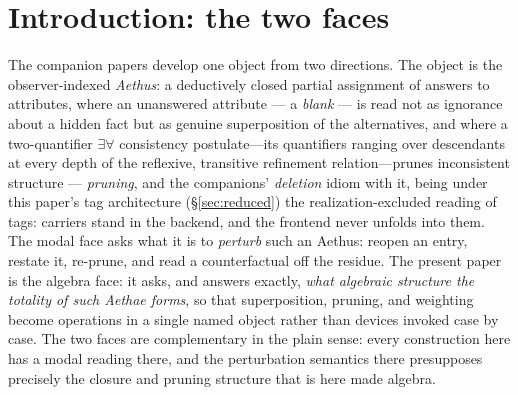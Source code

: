 \begin{abstract}
\end{abstract}

\section{Introduction: the two faces}
\label{sec:intro}

The companion papers develop one object from two directions. The object is the observer-indexed \emph{Aethus}: a deductively closed partial assignment of answers to attributes, where an unanswered attribute --- a \emph{blank} --- is read not as ignorance about a hidden fact but as genuine superposition of the alternatives, and where a two-quantifier $\exists\forall$ consistency postulate---its quantifiers ranging over descendants at every depth of the reflexive, transitive refinement relation---prunes inconsistent structure --- \emph{pruning}, and the companions' \emph{deletion} idiom with it, being under this paper's tag architecture (§\ref{sec:reduced}) the realization-excluded reading of tags: carriers stand in the backend, and the frontend never unfolds into them. The modal face \cite{AethusSemantics} asks what it is to \emph{perturb} such an Aethus: reopen an entry, restate it, re-prune, and read a counterfactual off the residue. The present paper is the algebra face: it asks, and answers exactly, \emph{what algebraic structure the totality of such Aethae forms}, so that superposition, pruning, and weighting become operations in a single named object rather than devices invoked case by case. The two faces are complementary in the plain sense: every construction here has a modal reading there, and the perturbation semantics there presupposes precisely the closure and pruning structure that is here made algebra.


